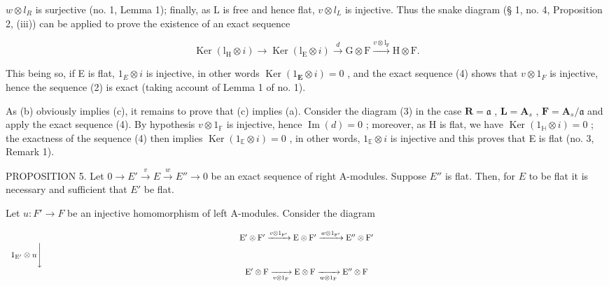 \(w \otimes l_{R}\) is surjective (no. 1, Lemma 1); finally, as L is free and hence flat, \(v \otimes l_{L}\) is injective. Thus the snake diagram (§ 1, no. 4, Proposition 2, (iii)) can be applied to prove the existence of an exact sequence

\[
\operatorname{Ker} \left(\mathrm{l} _ {\mathrm{H}} \otimes i\right) \longrightarrow \operatorname{Ker} \left(\mathrm{l} _ {\mathrm{E}} \otimes i\right) \xrightarrow {d} \mathrm{G} \otimes \mathrm{F} \xrightarrow {v \otimes \mathrm{l} _ {\mathrm{F}}} \mathrm{H} \otimes \mathrm{F}.\tag{4}
\]

This being so, if E is flat, \(1_{E} \otimes i\) is injective, in other words \(\operatorname{Ker}(1_{\mathbf{E}} \otimes i) = 0\) , and the exact sequence (4) shows that \(v \otimes 1_{F}\) is injective, hence the sequence (2) is exact (taking account of Lemma 1 of no. 1).

As (b) obviously implies (c), it remains to prove that (c) implies (a). Consider the diagram (3) in the case \(\mathbf{R} = \mathfrak{a}\) , \(\mathbf{L} = \mathbf{A}_s\) , \(\mathbf{F} = \mathbf{A}_s / \mathfrak{a}\) and apply the exact sequence (4). By hypothesis \(v \otimes 1_{\mathbb{F}}\) is injective, hence \(\operatorname{Im}(d) = 0\) ; moreover, as H is flat, we have \(\operatorname{Ker}(1_{\mathbb{H}} \otimes i) = 0\) ; the exactness of the sequence (4) then implies \(\operatorname{Ker}(1_{\mathbb{E}} \otimes i) = 0\) , in other words, \(1_{\mathbb{E}} \otimes i\) is injective and this proves that E is flat (no. 3, Remark 1).

PROPOSITION 5. Let \(0 \to E' \xrightarrow{v} E \xrightarrow{w} E'' \to 0\) be an exact sequence of right A-modules. Suppose \(E''\) is flat. Then, for \(E\) to be flat it is necessary and sufficient that \(E'\) be flat.

Let \(u: F' \to F\) be an injective homomorphism of left A-modules. Consider the diagram

\[
\begin{array}{c} \mathrm{E} ^ {\prime} \otimes \mathrm{F} ^ {\prime} \xrightarrow {v \otimes 1 _ {\mathrm{F} ^ {\prime}}} \mathrm{E} \otimes \mathrm{F} ^ {\prime} \xrightarrow {w \otimes 1 _ {\mathrm{F} ^ {\prime}}} \mathrm{E} ^ {\prime \prime} \otimes \mathrm{F} ^ {\prime} \\ 1 _ {\mathrm{E} ^ {\prime}} \otimes u \Bigg \downarrow \qquad \qquad \qquad \qquad \qquad \qquad \qquad \qquad \qquad \qquad \qquad \qquad \qquad \qquad \qquad \qquad \qquad \qquad \qquad \qquad \qquad \qquad \qquad \qquad \qquad \qquad \qquad \qquad \qquad \qquad \qquad \qquad \qquad \qquad \\ \mathrm{E} ^ {\prime} \otimes \mathrm{F} \xrightarrow [ v \otimes 1 _ {\mathrm{F}} ]{} \mathrm{E} \otimes \mathrm{F} \xrightarrow [ w \otimes 1 _ {\mathrm{F}} ]{} \mathrm{E} ^ {\prime \prime} \otimes \mathrm{F} \end{array}
\]

